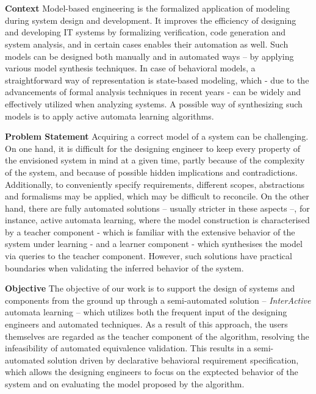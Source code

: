 \chapter{\bevezetes}

\textbf{Context} Model-based engineering is the formalized application of modeling during system design and development. It improves the efficiency of designing and developing IT systems by formalizing verification, code generation and system analysis, and in certain cases enables their automation as well. Such models can be designed both manually and in automated ways -- by applying various model synthesis techniques. In case of behavioral models, a straightforward way of representation is state-based modeling, which - due to the advancements of formal analysis techniques in recent years - can be widely and effectively utilized when analyzing systems. A possible way of synthesizing such models is to apply active automata learning algorithms. 

\textbf{Problem Statement} Acquiring a correct model of a system can be challenging. On one hand, it is difficult for the designing engineer to keep every property of the envisioned system in mind at a given time, partly because of the complexity of the system, and because of possible hidden implications and contradictions. Additionally, to conveniently specify requirements, different scopes, abstractions and formalisms may be applied, which may be difficult to reconcile. On the other hand, there are fully automated solutions -- usually stricter in these aspects --, for instance, active automata learning, where the model construction is characterised by a teacher component - which is familiar with the extensive behavior of the system under learning - and a learner component - which synthesises the model via queries to the teacher component. However, such solutions have practical boundaries when validating the inferred behavior of the system.

\textbf{Objective} The objective of our work is to support the design of systems and components from the ground up through a semi-automated solution -- \textit{InterActive} automata learning --  which utilizes both the frequent input of the designing engineers and automated techniques. As a result of this approach, the users themselves are regarded as the teacher component of the algorithm, resolving the infeasibility of automated equivalence validation. This results in a semi-automated solution driven by declarative behavioral requirement specification, which allows the designing engineers to focus on the exptected behavior of the system and on evaluating the model proposed by the algorithm.

